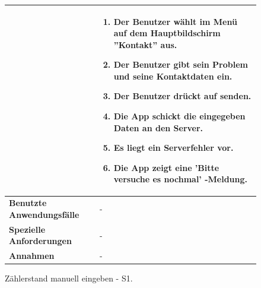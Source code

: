 \begin{figure}[h]
	\centering
	\begin{tabularx}{\textwidth}{ X | X }
&
		\begin{enumerate}
			\item Der Benutzer wählt im Menü auf dem Hauptbildschirm ''Kontakt'' aus. 
			\item Der Benutzer gibt sein Problem und seine Kontaktdaten ein.
			\item Der Benutzer drückt auf senden.
			\item Die App schickt die eingegeben Daten an den Server.
			\item Es liegt ein Serverfehler vor.
			\item Die App zeigt eine 'Bitte versuche es nochmal' -Meldung.
		\end{enumerate} \\ \hline
		\textbf{Benutzte Anwendungsfälle} & - \\ \hline
		\textbf{Spezielle Anforderungen} & - \\ \hline
		\textbf{Annahmen} & -
	\end{tabularx}
	\caption{Zählerstand manuell eingeben - S1.}
	\label{fig:anwendungsfall-server-tabelle-xx-1}
\end{figure}

\newpage

